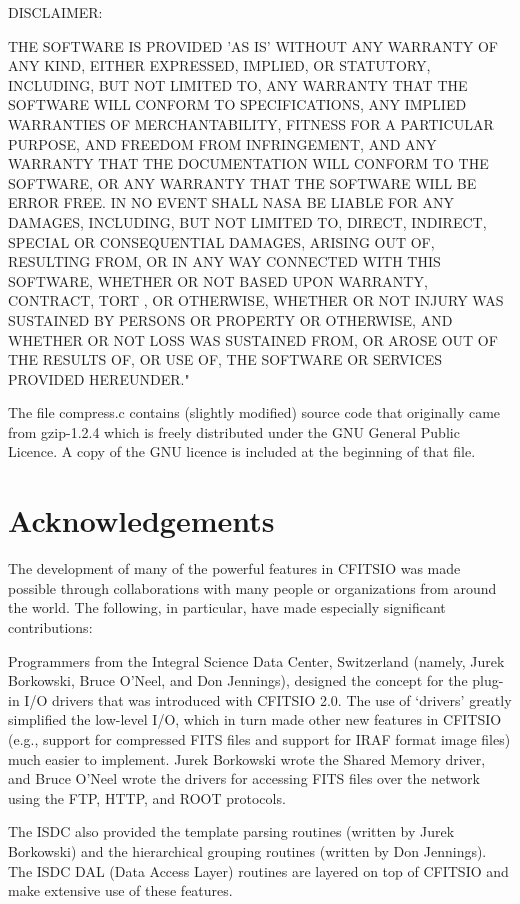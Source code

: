 \documentclass[11pt]{book}
\begin{document}
DISCLAIMER:

THE SOFTWARE IS PROVIDED 'AS IS' WITHOUT ANY WARRANTY OF ANY KIND,
EITHER EXPRESSED, IMPLIED, OR STATUTORY, INCLUDING, BUT NOT LIMITED TO,
ANY WARRANTY THAT THE SOFTWARE WILL CONFORM TO SPECIFICATIONS, ANY
IMPLIED WARRANTIES OF MERCHANTABILITY, FITNESS FOR A PARTICULAR
PURPOSE, AND FREEDOM FROM INFRINGEMENT, AND ANY WARRANTY THAT THE
DOCUMENTATION WILL CONFORM TO THE SOFTWARE, OR ANY WARRANTY THAT THE
SOFTWARE WILL BE ERROR FREE.  IN NO EVENT SHALL NASA BE LIABLE FOR ANY
DAMAGES, INCLUDING, BUT NOT LIMITED TO, DIRECT, INDIRECT, SPECIAL OR
CONSEQUENTIAL DAMAGES, ARISING OUT OF, RESULTING FROM, OR IN ANY WAY
CONNECTED WITH THIS SOFTWARE, WHETHER OR NOT BASED UPON WARRANTY,
CONTRACT, TORT , OR OTHERWISE, WHETHER OR NOT INJURY WAS SUSTAINED BY
PERSONS OR PROPERTY OR OTHERWISE, AND WHETHER OR NOT LOSS WAS SUSTAINED
FROM, OR AROSE OUT OF THE RESULTS OF, OR USE OF, THE SOFTWARE OR
SERVICES PROVIDED HEREUNDER."

The file compress.c contains (slightly modified) source code that
originally came from gzip-1.2.4 which is freely distributed under the
GNU General Public Licence.  A copy of the GNU licence is included
at the beginning of that file.


\section{Acknowledgements}

The development of many of the powerful features in CFITSIO was made
possible through collaborations with many people or organizations from
around the world.  The following, in particular, have made especially
significant contributions:

Programmers from the Integral Science Data Center, Switzerland (namely,
Jurek Borkowski, Bruce O'Neel, and Don Jennings), designed the concept
for the plug-in I/O drivers that was introduced with CFITSIO 2.0.  The
use of `drivers' greatly simplified  the low-level I/O, which in turn
made other new features in CFITSIO (e.g., support for compressed FITS
files and support for IRAF format image files) much easier to
implement.  Jurek Borkowski wrote the Shared Memory driver, and Bruce
O'Neel wrote the drivers for accessing FITS files over the network
using the FTP, HTTP, and ROOT protocols.

The ISDC also provided the template parsing routines (written by Jurek
Borkowski) and the hierarchical grouping routines (written by Don
Jennings).  The ISDC DAL (Data Access Layer) routines are layered on
top of CFITSIO and make extensive use of these features.
\end{document}
